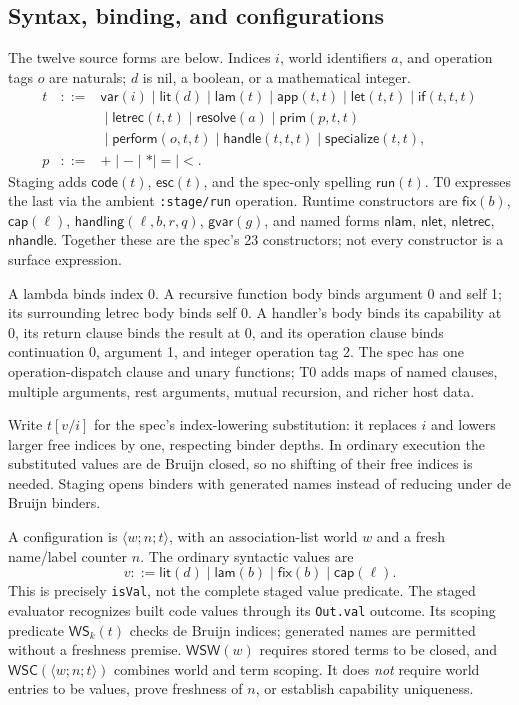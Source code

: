 \documentclass[acmsmall,screen,review,nonacm]{acmart}
\newcommand{\kw}[1]{\mathsf{#1}}
\newcommand{\cfg}[3]{\langle #1;#2;#3\rangle}
\newcommand{\sub}[3]{#1[#2/#3]}
\newcommand{\app}[2]{\kw{app}(#1,#2)}
\newcommand{\lam}[1]{\kw{lam}(#1)}
\newcommand{\fix}[1]{\kw{fix}(#1)}
\newcommand{\lit}[1]{\kw{lit}(#1)}
\newcommand{\handling}[4]{\kw{handling}(#1,#2,#3,#4)}
\newcommand{\code}[1]{\kw{code}(#1)}
\newcommand{\esc}[1]{\kw{esc}(#1)}
\newcommand{\run}[1]{\kw{run}(#1)}
\newcommand{\WS}{\kw{WS}}
\newcommand{\WSW}{\kw{WSW}}
\newcommand{\WSC}{\kw{WSC}}
\newcommand{\src}[1]{{\normalfont\nolinkurl{#1}}}
\begin{document}
\subsection{Syntax, binding, and configurations}
The twelve source forms are below. Indices $i$, world identifiers $a$, and
operation tags $o$ are naturals; $d$ is nil, a boolean, or a mathematical integer.
\[
\begin{array}{rcl}
t &::=& \kw{var}(i)\mid\lit d\mid\lam t\mid\app t t
       \mid\kw{let}(t,t)\mid\kw{if}(t,t,t)\\
 &&{}\mid\kw{letrec}(t,t)\mid\kw{resolve}(a)\mid\kw{prim}(p,t,t)\\
 &&{}\mid\kw{perform}(o,t,t)\mid\kw{handle}(t,t,t)
       \mid\kw{specialize}(t,t),\\
p &::=& +\mid -\mid *\mid =\mid <.
\end{array}
\]
Staging adds $\code t$, $\esc t$, and the spec-only spelling $\run t$.
T0 expresses the last via the ambient \src{:stage/run} operation. Runtime
constructors are $\fix b$, $\kw{cap}(\ell)$, $\handling\ell b r q$,
$\kw{gvar}(g)$, and named forms $\kw{nlam}$, $\kw{nlet}$,
$\kw{nletrec}$, $\kw{nhandle}$. Together these are the spec's 23 constructors;
not every constructor is a surface expression.

A lambda binds index 0. A recursive function body binds argument 0 and self 1;
its surrounding letrec body binds self 0. A handler's body binds its capability
at 0, its return clause binds the result at 0, and its operation clause binds
continuation 0, argument 1, and integer operation tag 2. The spec has one
operation-dispatch clause and unary functions; T0 adds maps of named clauses,
multiple arguments, rest arguments, mutual recursion, and richer host data.

Write $\sub t v i$ for the spec's index-lowering substitution: it replaces $i$
and lowers larger free indices by one, respecting binder depths. In ordinary
execution the substituted values are de Bruijn closed, so no shifting of their
free indices is needed. Staging opens binders with generated names instead of
reducing under de Bruijn binders.

A configuration is $\cfg w n t$, with an association-list world $w$ and a fresh
name/label counter $n$. The ordinary syntactic values are
\[
 v ::= \lit d\mid\lam b\mid\fix b\mid\kw{cap}(\ell).
\]
This is precisely \src{isVal}, not the complete staged value predicate. The
staged evaluator recognizes built code values through its \src{Out.val}
outcome. Its scoping predicate $\WS_k(t)$ checks de Bruijn indices; generated
names are permitted without a freshness premise. $\WSW(w)$ requires stored
terms to be closed, and $\WSC(\cfg w n t)$ combines world and term scoping.
It does \emph{not} require world entries to be values, prove freshness of $n$,
or establish capability uniqueness.
\end{document}
